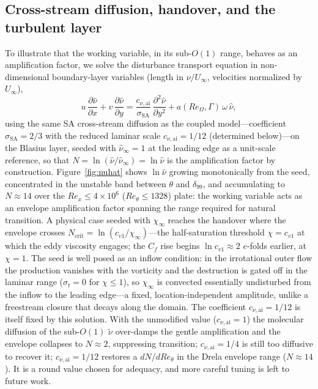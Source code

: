 \documentclass[journal]{new-aiaa}
\begin{document}
\subsection{Cross-stream diffusion, handover, and the turbulent layer}\label{sec:calib_diff}

To illustrate that the working variable, in its sub-$O(1)$ range, behaves as an
amplification factor, we solve the disturbance transport equation in
non-dimensional boundary-layer variables (length in $\nu/U_\infty$, velocities
normalized by $U_\infty$),
\begin{equation}
  u\,\frac{\partial\hat\nu}{\partial x} + v\,\frac{\partial\hat\nu}{\partial y}
  = \frac{c_{\nu,\mathrm{ai}}}{\sigma_\mathrm{SA}}\,\frac{\partial^2\hat\nu}{\partial y^2}
    + a(Re_\Omega,\Gamma)\,\omega\,\hat\nu,
  \label{eq:transport}
\end{equation}
using the same SA cross-stream diffusion as the coupled model---coefficient
$\sigma_\mathrm{SA}\!=\!2/3$ with the reduced laminar scale
$c_{\nu,\mathrm{ai}}\!=\!1/12$ (determined below)---on the Blasius layer, seeded
with $\hat\nu_\infty\!=\!1$ at the leading edge as a unit-scale reference, so that
$N\!=\!\ln(\hat\nu/\hat\nu_\infty)\!=\!\ln\hat\nu$ is the amplification factor by
construction. Figure~\ref{fig:nuhat} shows $\ln\hat\nu$ growing monotonically
from the seed, concentrated in the unstable band between $\theta$ and
$\delta_{99}$, and accumulating to $N\!\approx\!14$ over the
$Re_x\!\le\!4\!\times\!10^6$ ($Re_\theta\!\le\!1328$) plate: the working variable
acts as an envelope amplification factor spanning the range required for natural
transition. A physical case seeded with $\chi_\infty$ reaches the handover where
the envelope crosses $N_\mathrm{crit}\!=\!\ln(c_{v1}/\chi_\infty)$---the
half-saturation threshold $\chi\!=\!c_{v1}$ at which the eddy viscosity engages;
the $C_f$ rise begins $\ln c_{v1}\!\approx\!2$ $e$-folds earlier, at
$\chi\!=\!1$. The seed is well posed as an inflow
condition: in the irrotational outer flow the production vanishes with the
vorticity and the destruction is gated off in the laminar range ($\sigma_t\!=\!0$
for $\chi\!\le\!1$), so $\chi_\infty$ is convected essentially undisturbed from the
inflow to the leading edge---a fixed, location-independent amplitude, unlike a
freestream closure that decays along the domain.
The coefficient $c_{\nu,\mathrm{ai}}\!=\!1/12$ is itself fixed by this
solution. With the unmodified value
($c_{\nu,\mathrm{ai}}\!=\!1$) the molecular diffusion of the sub-$O(1)$
$\tilde\nu$ over-damps the gentle amplification and the envelope collapses to
$N\!\approx\!2$, suppressing transition; $c_{\nu,\mathrm{ai}}\!=\!1/4$ is still
too diffusive to recover it; $c_{\nu,\mathrm{ai}}\!=\!1/12$ restores a
$dN/dRe_\theta$ in the Drela envelope range ($N\!\approx\!14$). It is a round
value chosen for adequacy, and more careful tuning is left to future work.
\end{document}
